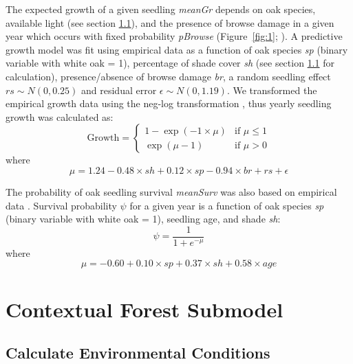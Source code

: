 \documentclass[
11pt, %
a4paper, %
oneside, %
headinclude,footinclude, %
]{scrartcl}
\begin{document}
The expected growth of a given seedling \textit{meanGr} depends on oak species, available light (see section \ref{environmental}), and the presence of browse damage in a given year which occurs with fixed probability \textit{pBrowse} (Figure~\ref{fig:1}; \citep{Kellner2016c}). A predictive growth model was fit using empirical data \citep{Kellner2016b} as a function of oak species \textit{sp} (binary variable with white oak = 1), percentage of shade cover \textit{sh} (see section \ref{environmental} for calculation), presence/absence of browse damage \textit{br}, a random seedling effect $rs \sim N(0, 0.25)$ and residual error $\epsilon \sim N(0, 1.19)$. We transformed the empirical growth data using the neg-log transformation \citep{Whittaker2005}, thus yearly seedling growth was calculated as:
\begin{equation}
\text{Growth} = 
\begin{cases} 
1 - \exp{(-1 \times \mu)} & \text{if } \mu \leq 1 \\
\exp{(\mu - 1)}       & \text{if } \mu > 0
\end{cases}
\end{equation}
where
\begin{equation}
\mu = 1.24 - 0.48 \times sh + 0.12 \times sp - 0.94 \times br + rs + \epsilon
\end{equation}

The probability of oak seedling survival \textit{meanSurv} was also based on empirical data \citep{Kellner2016b}. Survival probability $\psi$ for a given year is a function of oak species \textit{sp} (binary variable with white oak = 1), seedling age, and shade \textit{sh}:
\begin{equation}
\psi = \frac{1}{1 + e^{-\mu}}
\end{equation}
where
\begin{equation}
\mu = -0.60 + 0.10 \times sp + 0.37 \times sh + 0.58 \times age
\end{equation}

\section{Contextual Forest Submodel}
\label{contextual}

\subsection{Calculate Environmental Conditions}
\label{environmental}
\end{document}

